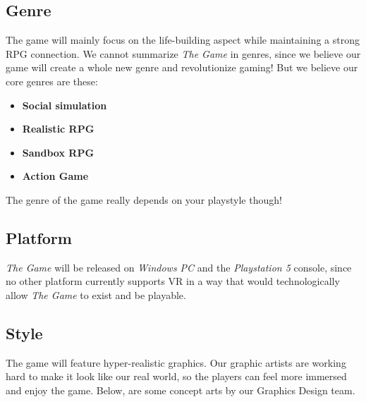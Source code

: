 \documentclass[a4paper,10pt,english]{article}
\begin{document}
\subsection*{Genre}
The game will mainly focus on the life-building aspect while maintaining a strong RPG connection. We cannot summarize \emph{The Game} in genres, since we believe our game will create a whole new genre and revolutionize gaming! But we believe our core genres are these:
\begin{itemize}
    \item \textbf{Social simulation}
    \item \textbf{Realistic RPG}
    \item \textbf{Sandbox RPG}
    \item \textbf{Action Game}
\end{itemize}
The genre of the game really depends on your playstyle though!
\subsection*{Platform}
\emph{The Game} will be released on \emph{Windows PC} and the \emph{Playstation 5} console, since no other platform currently supports VR in a way that would technologically allow \emph{The Game} to exist and be playable.

\subsection*{Style}
The game will feature hyper-realistic graphics. Our graphic artists are working hard to make it look like our real world, so the players can feel more immersed and enjoy the game. Below, are some concept arts by our Graphics Design team.
\end{document}

